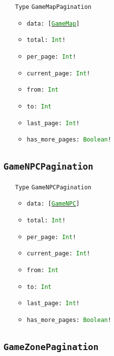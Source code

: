 \documentclass[10pt, a4paper]{memoir}
\numberwithin{equation}{section}
\theoremstyle{plain}
\theoremstyle{defp}
\theoremstyle{dotless}
\theoremstyle{definition}
\theoremstyle{dotless}
\theoremstyle{dotless}
\theoremstyle{defp}
\theoremstyle{defp}
\theoremstyle{be}          %
\theoremstyle{defp}
\newcommand\ttt[1]{\texttt{#1}}
\newcommand\type[1]{\ttt{\textcolor{green}{#1}}}
\begin{document}
\begin{itemize}[noitemsep,topsep=1pt]
\item[\ttt{Type}] \ttt{GameMapPagination}
\begin{itemize}[itemsep=1pt,topsep=1pt]
\item \ttt{data: [\hyperref[sec:GameMap]{\type{GameMap}}]}
\item \ttt{total: \type{Int}!}
\item \ttt{per\_page: \type{Int}!}
\item \ttt{current\_page: \type{Int}!}
\item \ttt{from: \type{Int}}
\item \ttt{to: \type{Int}}
\item \ttt{last\_page: \type{Int}!}
\item \ttt{has\_more\_pages: \type{Boolean}!}
\end{itemize}
\end{itemize}

\subsection{\ttt{GameNPCPagination}}\label{sec:gamenpcpagination}

\begin{itemize}[noitemsep,topsep=1pt]
\item[\ttt{Type}] \ttt{GameNPCPagination}
\begin{itemize}[itemsep=1pt,topsep=1pt]
\item \ttt{data: [\hyperref[sec:GameNPC]{\type{GameNPC}}]}
\item \ttt{total: \type{Int}!}
\item \ttt{per\_page: \type{Int}!}
\item \ttt{current\_page: \type{Int}!}
\item \ttt{from: \type{Int}}
\item \ttt{to: \type{Int}}
\item \ttt{last\_page: \type{Int}!}
\item \ttt{has\_more\_pages: \type{Boolean}!}
\end{itemize}
\end{itemize}

\subsection{\ttt{GameZonePagination}}\label{sec:gamezonepagination}
\end{document}
